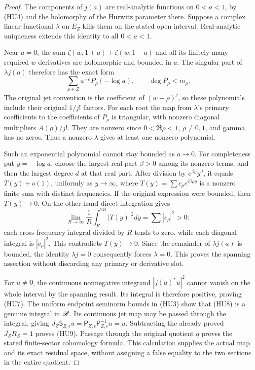 \documentclass[11pt]{article}
\begin{document}
\begin{proof}
The components of $j(a)$ are real-analytic functions on $0<a<1$,
by (HU4) and the holomorphy of the Hurwitz parameter there.
Suppose a complex linear functional $\lambda$ on $E_Z$ kills
them on the stated open interval. Real-analytic uniqueness extends
this identity to all $0<a<1$.

Near $a=0$, the sum
$\zeta(w,1+a)+\zeta(w,1-a)$ and all its finitely many required
$w$ derivatives are holomorphic and bounded in $a$.
The singular part of $\lambda j(a)$ therefore has the exact form
\[
 \sum_{\rho\in Z}a^{-\rho}P_\rho(-\log a),
       \qquad \deg P_\rho<m_\rho.
 \tag{HU10}
\]
The original jet convention is the coefficient of $(w-\rho)^j$,
so these polynomials include their original $1/j!$ factors.
For each root the map from $\lambda$'s primary coefficients to
the coefficients of $P_\rho$ is triangular, with nonzero diagonal
multipliers $A(\rho)/j!$. They are nonzero since
$0<\Re\rho<1$, $\rho\ne0,1$, and gamma has no zeros.
Thus a nonzero $\lambda$ gives at least one nonzero polynomial.

Such an exponential polynomial cannot stay bounded as $a\to0$.
For completeness put $y=-\log a$, choose the largest real part
$\beta>0$ among its nonzero terms, and then the largest degree $d$
at that real part. After division by $e^{\beta y}y^d$, it equals
$T(y)+o(1)$, uniformly as $y\to\infty$, where
$T(y)=\sum c_\rho e^{i\Im\rho y}$ is a nonzero finite sum with
distinct frequencies. If the original expression were bounded,
then $T(y)\to0$. On the other hand direct integration gives
\[
 \lim_{R\to\infty}\frac1R\int_R^{2R}|T(y)|^2dy
       =\sum |c_\rho|^2>0:
\]
each cross-frequency integral divided by $R$ tends to zero,
while each diagonal integral is $|c_\rho|^2$. This contradicts
$T(y)\to0$. Since the remainder of $\lambda j(a)$ is bounded,
the identity $\lambda j=0$ consequently forces $\lambda=0$.
This proves the spanning assertion without discarding any primary
or derivative slot.

For $u\ne0$, the continuous nonnegative integrand
$|j(a)^*u|^2$ cannot vanish on the whole interval by the spanning
result. Its integral is therefore positive, proving (HU7).
The uniform endpoint seminorm bounds in (HU3) show that (HU8)
is a genuine integral in $\mathscr B$. Its continuous jet map may be
passed through the integral, giving
$J_Z\mathsf S_{Z,\epsilon}u
=\mathsf P_{Z,\epsilon}\mathsf P_{Z,\epsilon}^{-1}u=u$.
Subtracting the already proved $J_ZR_Z=1$ proves (HU9).
Passage through the original quotient $q$ proves the stated
finite-sector cohomology formula. This calculation supplies the
actual map and its exact residual space, without assigning a
false equality to the two sections in the entire quotient.
\end{proof}
\end{document}
